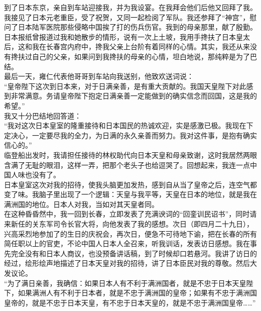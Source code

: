 到了日本东京，亲自到车站迎接我，并为我设宴。在我拜会他们后他又回拜了我。我接见了日本元老重臣，受了祝贺，又同一起检阅了军队。我还参拜了“神宫”，慰问了日本陆军医院那些侵略中国挨了打的伤兵伤官。我到的母亲那里，献了殷勤。日本报纸曾报道过我和她散步的情形，说有一次上土坡，我用手搀扶了日本皇太后，这和我在长春宫内府中，搀我父亲上台阶有着同样的心情。其实，我还从来没有搀扶过自己的父亲，如果问到我搀扶的母亲的心情，坦白地说，那纯粹是为了巴结。\\

最后一天，雍仁代表他哥哥到车站向我送别，他致欢送词说：\\

“皇帝陛下这次到日本来，对于日满亲善，是有重大贡献的。我国天皇陛下对此感到非常满意。务请皇帝陛下抱定日满亲善一定能做到的确实信念而回国，这是我的希望。”\\

我又十分巴结地回答道：\\

“我对这次日本皇室的隆重接待和日本国民的热诚欢迎，实是感激已极。我现在下定决心，一定要尽我的全力，为日满的永久亲善而努力。我对这件事，是抱有确实信心的。”\\

临登船出发时，我请担任接待的林权助代向日本天皇和母亲致谢，这时我居然两眼含满了无耻的眼泪，这样一弄，把那个老头子也给逗哭了。回想起来，我连一点中国人味也没有了。\\

日本皇室这次对我的招待，使我头脑更加发热，感到自从当了皇帝之后，连空气都变了味。我脑子里出现了一个逻辑：天皇与我平等，天皇在日本的地位，就是我在满洲国的地位。日本人对我，当如对其天皇者同。\\

在这种昏昏然中，我一回到长春，立即发表了充满谀词的“回銮训民诏书”，同时请来新任的关东军司令长官大将，向他发表了我的感想。次日（即四月二十九日），兴高采烈地参加了的生日的庆祝会，再次日，便急不可待地下谕，把在长春的所有简任职以上的官吏，不论中国人日本人全召来，听我训话，发表访日感想。我在事先完全没有和日本人商议，也没预备讲话稿，到了时候却口若悬河。我讲了访日的经过，绘形绘声地描述了日本天皇对我的招待，讲了日本臣民对我的尊敬。然后大发议论。\\

“为了满日亲善，我确信：如果日本人有不利于满洲国者，就是不忠于日本天皇陛下，如果满洲人有不利于日本者，就是不忠于满洲国的皇帝；如果有不忠于满洲国皇帝的，就是不忠于日本天皇，有不忠于日本天皇的，就是不忠于满洲国皇帝……”\\

